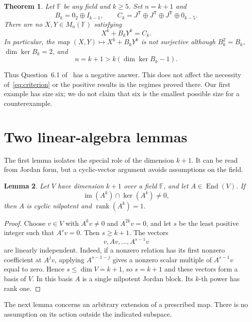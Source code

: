 \documentclass[11pt]{article}
\newtheorem{theorem}{Theorem}[section]
\newtheorem{lemma}[theorem]{Lemma}
\theoremstyle{remark}\newtheorem{remark}[theorem]{Remark}
\newcommand{\F}{\mathbb F}
\newcommand{\im}{\operatorname{im}}
\newcommand{\rk}{\operatorname{rank}}
\newcommand{\End}{\operatorname{End}}
\begin{document}
\begin{theorem}\label{thm:main}
Let $\F$ be any field and $k\ge5$. Set $n=k+1$ and
\begin{equation}\label{eq:matrices}
 B_k=0_2\oplus I_{k-1},\qquad
 C_k=J^{\mathsf T}\oplus J^{\mathsf T}\oplus J^{\mathsf T}\oplus0_{k-5}.
\end{equation}
There are no $X,Y\in M_n(\F)$ satisfying
\begin{equation}\label{eq:impossible}
 X^k+B_kY^k=C_k.
\end{equation}
In particular, the map $(X,Y)\mapsto X^k+B_kY^k$ is not surjective although $B_k^2=B_k$, $\dim\ker B_k=2$, and
\[
 n=k+1>k(\dim\ker B_k-1).
\]
\end{theorem}

Thus Question~6.1 of~\cite{SS} has a negative answer. This does not affect the necessity of~\eqref{eq:criterion} or the positive results in the regimes proved there. Our first example has size six; we do not claim that six is the smallest possible size for a counterexample.

\section{Two linear-algebra lemmas}
The first lemma isolates the special role of the dimension $k+1$. It can be read from Jordan form, but a cyclic-vector argument avoids assumptions on the field.

\begin{lemma}\label{lem:rigid}
Let $V$ have dimension $k+1$ over a field $\F$, and let $A\in\End(V)$. If
\[
 \im(A^k)\cap\ker(A^k)\ne0,
\]
then $A$ is cyclic nilpotent and $\rk(A^k)=1$.
\end{lemma}
\begin{proof}
Choose $v\in V$ with $A^kv\ne0$ and $A^{2k}v=0$, and let $s$ be the least positive integer such that $A^sv=0$. Then $s\ge k+1$. The vectors
\[
 v,Av,\ldots,A^{s-1}v
\]
are linearly independent. Indeed, if a nonzero relation has its first nonzero coefficient at $A^jv$, applying $A^{s-1-j}$ gives a nonzero scalar multiple of $A^{s-1}v$ equal to zero. Hence $s\le\dim V=k+1$, so $s=k+1$ and these vectors form a basis of $V$. In this basis $A$ is a single nilpotent Jordan block. Its $k$-th power has rank one.
\end{proof}

The next lemma concerns an arbitrary extension of a prescribed map. There is no assumption on its action outside the indicated subspace.
\end{document}
